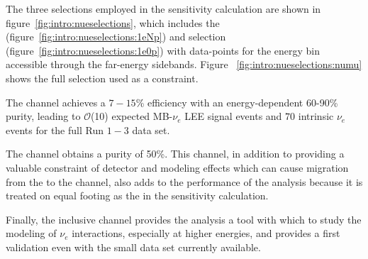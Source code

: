 \par The three selections employed in the sensitivity calculation are shown in figure~\ref{fig:intro:nueselections}, which includes the  \npsel (figure~\ref{fig:intro:nueselections:1eNp}) and \zpsel selection (figure~\ref{fig:intro:nueselections:1e0p}) with data-points for the energy bin accessible through the far-energy sidebands. Figure ~\ref{fig:intro:nueselections:numu} shows the full \numu selection used as a constraint. %
\par The \npsel channel achieves a $7-15$\% efficiency with an energy-dependent 60-90\%  purity, leading to $\mathcal{O}$(10) expected MB-$\nu_e$ LEE signal events and $70$ intrinsic $\nu_e$ events for the full Run $1-3$ data set.%
\par The \zpsel channel obtains a purity of 50\%. This channel, in addition to providing a valuable constraint of detector and modeling effects which can cause migration from the \npsel to the \zpsel channel, also adds to the performance of the analysis because it is treated on equal footing as the \npsel in the sensitivity calculation.
\par Finally, the inclusive channel provides the analysis a tool with which to study the modeling of $\nu_e$ interactions, especially at higher energies, and provides a first validation even with the small data set currently available.

